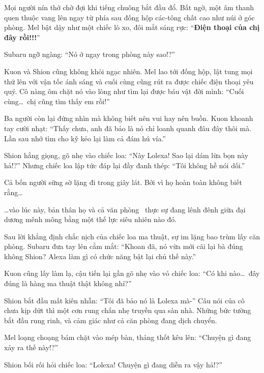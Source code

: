 \documentclass[../main.tex]{subfiles}
\begin{document}
Mọi người nín thở chờ đợi khi tiếng chuông bắt đầu đổ. Bất ngờ, một âm thanh quen thuộc vang lên ngay từ phía sau đống hộp các-tông chất cao như núi ở góc phòng. Mel bật dậy như một chiếc lò xo, đôi mắt sáng rực: ``\textbf{Điện thoại của chị đây rồi!!!}''

Subaru ngỡ ngàng: ``Nó ở ngay trong phòng này sao!?''

Kuon và Shion cũng không khỏi ngạc nhiên. Mel lao tới đống hộp, lật tung mọi thứ lên với vận tốc ánh sáng và cuối cùng cũng rút ra được chiếc điện thoại yêu quý. Cô nàng ôm chặt nó vào lòng như tìm lại được báu vật đời mình: ``Cuối cùng\dots\ chị cũng tìm thấy em rồi!''


Ba người còn lại đứng nhìn mà không biết nên vui hay nên buồn. Kuon khoanh tay cười nhạt: ``Thấy chưa, anh đã bảo là nó chỉ loanh quanh đâu đây thôi mà. Lần sau nhớ tìm cho kỹ kẻo lại làm cả đám hú vía.''

Shion hắng giọng, gõ nhẹ vào chiếc loa: ``Này Lolexa! Sao lại dám lừa bọn này hả!?''
Nhưng chiếc loa lập tức đáp lại đầy đanh thép: ``Tôi không hề nói dối.''

Cả bốn người sững sờ lặng đi trong giây lát. Bởi vì họ hoàn toàn không biết rằng\dots


\dots vào lúc này, bản thân họ và cả văn phòng \hll\ thực sự đang lênh đênh giữa đại dương mênh mông bằng một thế lực siêu nhiên nào đó.

\omk

Sau lời khẳng định chắc nịch của chiếc loa ma thuật, sự im lặng bao trùm lấy căn phòng. Subaru đưa tay lên cằm mắt: ``Khoan đã, nó vừa mới cãi lại bà đúng không Shion? Alexa làm gì có chức năng bật lại chủ thế này.''

Kuon cũng lấy làm lạ, cậu tiến lại gần gõ nhẹ vào vỏ chiếc loa: ``Có khi nào\dots\ đây đúng là hàng ma thuật thật không nhỉ?''

Shion bắt đầu mất kiên nhẫn: ``Tôi đã bảo nó là Lolexa mà-'' Câu nói của cô chưa kịp dứt thì một cơn rung chấn nhẹ truyền qua sàn nhà. Những bức tường bắt đầu rung rinh, và cảm giác như cả căn phòng đang dịch chuyển.

Mel loạng choạng bám chặt vào mép bàn, thảng thốt kêu lên: ``Chuyện gì đang xảy ra thế này!?''

Shion bối rối hỏi chiếc loa: ``Lolexa! Chuyện gì đang diễn ra vậy hả!?''
\end{document}
